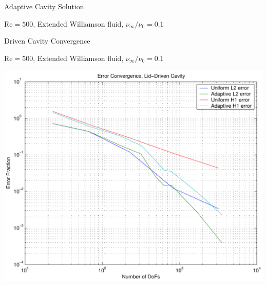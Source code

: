 \begin{foil}{Adaptive Cavity Solution}

\begin{center}
$\mbox{Re} = 500$, Extended Williamson fluid, 
$\nu_\infty/\nu_0 = 0.1$

\end{center}

\end{foil}


\begin{foil}{Driven Cavity Convergence}

\begin{center}
$\mbox{Re} = 500$, Extended Williamson fluid, 
$\nu_\infty/\nu_0 = 0.1$

\includegraphics[width=.7\textwidth]{figs/cavityerror}
\end{center}

\end{foil}


